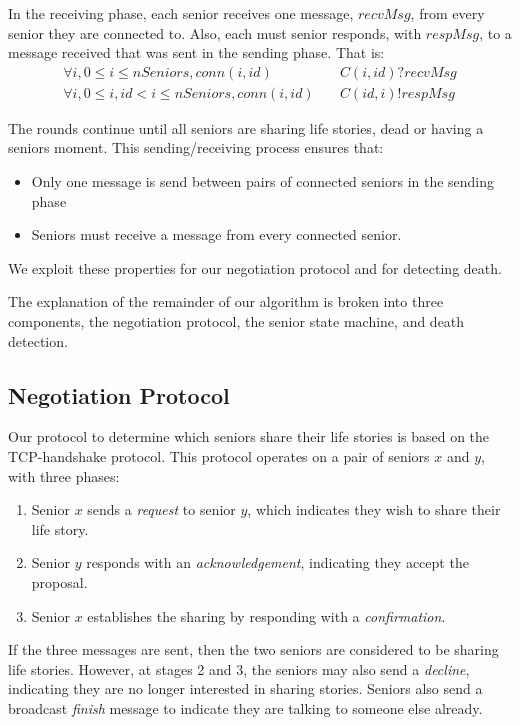 \documentclass[12pt,a4paper]{scrartcl}
\begin{document}
In the receiving phase, each senior receives one message, $recvMsg$, from every senior they are connected to.
Also, each must senior responds, with $respMsg$, to a message received that was sent in the sending phase.
That is:
\begin{align}
    \forall i, 0 \le i \le nSeniors, conn(i, id) &\quad C(i,id)?recvMsg \\
    \forall i, 0 \le i, id < i \le nSeniors, conn(i, id) &\quad C(id,i)!respMsg
\label{eq:recv-phase}
\end{align}

The rounds continue until all seniors are sharing life stories, dead or having a seniors moment.
This sending/receiving process ensures that:
\begin{itemize}
    \item Only one message is send between pairs of connected seniors in the sending phase
    \item Seniors must receive a message from every connected senior.
\end{itemize}
We exploit these properties for our negotiation protocol and for detecting death.

The explanation of the remainder of our algorithm is broken into three components, the negotiation protocol, the senior state machine, and death detection.

\subsection{Negotiation Protocol}
Our protocol to determine which seniors share their life stories is based on the TCP-handshake protocol.
This protocol operates on a pair of seniors $x$ and $y$, with three phases:
\begin{enumerate}
    \item Senior $x$ sends a \emph{request} to senior $y$, which indicates they wish to share their life story.
    \item Senior $y$ responds with an \emph{acknowledgement}, indicating they accept the proposal.
    \item Senior $x$ establishes the sharing by responding with a \emph{confirmation}.
\end{enumerate}

If the three messages are sent, then the two seniors are considered to be sharing life stories.
However, at stages 2 and 3, the seniors may also send a \emph{decline}, indicating they are no longer interested in sharing stories.
Seniors also send a broadcast \emph{finish} message to indicate they are talking to someone else already.
\end{document}
